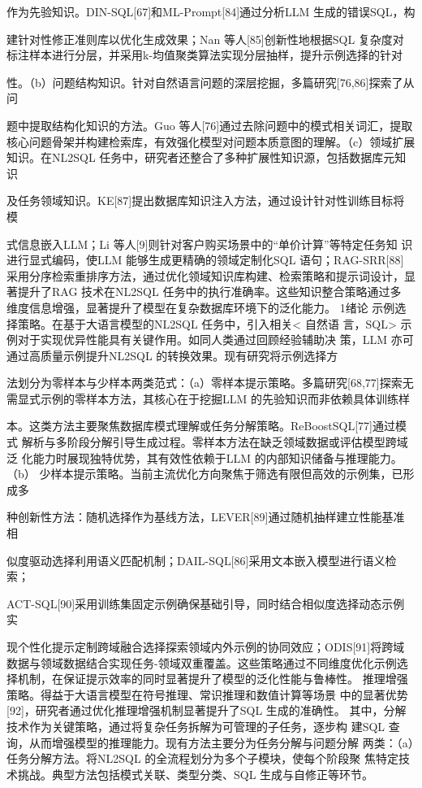 \documentclass[12pt,a4paper,openright,UTF8]{ctexbook}
\begin{document}
作为先验知识。DIN-SQL[67]和ML-Prompt[84]通过分析LLM 生成的错误SQL，构

建针对性修正准则库以优化生成效果；Nan 等人[85]创新性地根据SQL 复杂度对 标注样本进行分层，并采用k-均值聚类算法实现分层抽样，提升示例选择的针对

性。（b）问题结构知识。针对自然语言问题的深层挖掘，多篇研究[76,86]探索了从问

题中提取结构化知识的方法。Guo 等人[76]通过去除问题中的模式相关词汇，提取 核心问题骨架并构建检索库，有效强化模型对问题本质意图的理解。（c）领域扩展 知识。在NL2SQL 任务中，研究者还整合了多种扩展性知识源，包括数据库元知识

及任务领域知识。KE[87]提出数据库知识注入方法，通过设计针对性训练目标将模

式信息嵌入LLM；Li 等人[9]则针对客户购买场景中的“单价计算”等特定任务知 识进行显式编码，使LLM 能够生成更精确的领域定制化SQL 语句；RAG-SRR[88] 采用分序检索重排序方法，通过优化领域知识库构建、检索策略和提示词设计，显 著提升了RAG 技术在NL2SQL 任务中的执行准确率。这些知识整合策略通过多 维度信息增强，显著提升了模型在复杂数据库环境下的泛化能力。 1绪论 示例选择策略。在基于大语言模型的NL2SQL 任务中，引入相关< 自然语 言，SQL> 示例对于实现优异性能具有关键作用。如同人类通过回顾经验辅助决 策，LLM 亦可通过高质量示例提升NL2SQL 的转换效果。现有研究将示例选择方

法划分为零样本与少样本两类范式：（a）零样本提示策略。多篇研究[68,77]探索无 需显式示例的零样本方法，其核心在于挖掘LLM 的先验知识而非依赖具体训练样

本。这类方法主要聚焦数据库模式理解或任务分解策略。ReBoostSQL[77]通过模式 解析与多阶段分解引导生成过程。零样本方法在缺乏领域数据或评估模型跨域泛 化能力时展现独特优势，其有效性依赖于LLM 的内部知识储备与推理能力。（b） 少样本提示策略。当前主流优化方向聚焦于筛选有限但高效的示例集，已形成多

种创新性方法：随机选择作为基线方法，LEVER[89]通过随机抽样建立性能基准相

似度驱动选择利用语义匹配机制；DAIL-SQL[86]采用文本嵌入模型进行语义检索；

ACT-SQL[90]采用训练集固定示例确保基础引导，同时结合相似度选择动态示例实

现个性化提示定制跨域融合选择探索领域内外示例的协同效应；ODIS[91]将跨域 数据与领域数据结合实现任务-领域双重覆盖。这些策略通过不同维度优化示例选 择机制，在保证提示效率的同时显著提升了模型的泛化性能与鲁棒性。 推理增强策略。得益于大语言模型在符号推理、常识推理和数值计算等场景 中的显著优势[92]，研究者通过优化推理增强机制显著提升了SQL 生成的准确性。 其中，分解技术作为关键策略，通过将复杂任务拆解为可管理的子任务，逐步构 建SQL 查询，从而增强模型的推理能力。现有方法主要分为任务分解与问题分解 两类：（a）任务分解方法。将NL2SQL 的全流程划分为多个子模块，使每个阶段聚 焦特定技术挑战。典型方法包括模式关联、类型分类、SQL 生成与自修正等环节。
\end{document}
